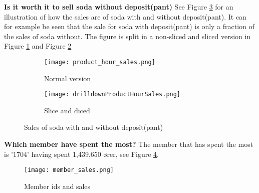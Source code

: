 	\textbf{Is it worth it to sell soda without deposit(pant)}
	See Figure \ref{fig:sodaSales} for an illustration of how the sales are of soda with and without deposit(pant). It can for example be seen that the sale for soda with deposit(pant) is only a fraction of the sales of soda without. The figure is split in a non-sliced and sliced version in Figure \ref{fig:sodaSalesNormal} and Figure \ref{fig:sodaSalesSliced}
	
	\begin{figure}
		\begin{subfigure}{.5\textwidth}
			\centering
			\texttt{[image: product\_hour\_sales.png]}
			\caption{Normal version}
			\label{fig:sodaSalesNormal}
		\end{subfigure}
		\begin{subfigure}{.5\textwidth}
			\centering
			\texttt{[image: drilldownProductHourSales.png]}
			\caption{Slice and diced}
			\label{fig:sodaSalesSliced}
		\end{subfigure}
\caption{Sales of soda with and without deposit(pant)}
\label{fig:sodaSales}
	\end{figure}
	
	\textbf{Which member have spent the most?}
	The member that has spent the most is '1704' having spent 1,439,650 ører, see Figure \ref{fig:memberSales}.
	
	\begin{figure}
		\centering
		\texttt{[image: member\_sales.png]}
		\caption{Member ids and sales}
		\label{fig:memberSales}
	\end{figure}

